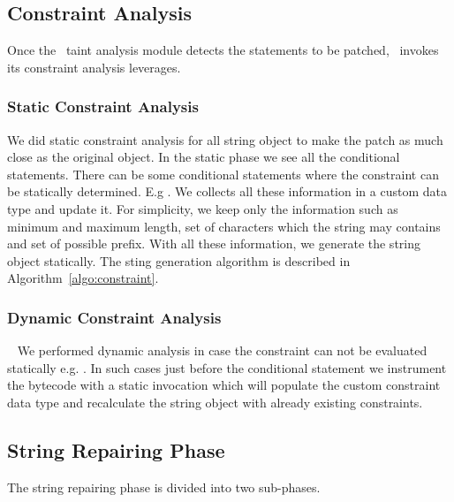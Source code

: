 \subsection{Constraint Analysis}
\label{subsec:constraint analysis}

Once the \infoflow\ taint analysis module detects the statements to be patched,
\tool\ invokes its constraint analysis leverages.

\subsubsection{Static Constraint Analysis}
\label{subsubsec:staticConstraint}

We did static constraint analysis for all string object to make the patch as much
close as the original object. In the static phase we see all the conditional 
statements. There can be some conditional statements where the constraint can 
be statically determined. E.g . We collects all these
information in a custom data type and update it. For simplicity, we keep only the 
information such as minimum and maximum length, set of characters which the string
may contains and set of possible prefix. With all these information, we generate 
the string object statically. The sting generation algorithm is described in
Algorithm~\ref{algo:constraint}. 

\subsubsection{Dynamic Constraint Analysis}
\label{subsubsec:dynamicConstraint}
~\newline
We performed dynamic analysis in case the constraint can not be evaluated 
statically e.g. . In such cases just
before the conditional statement we instrument the bytecode with a static 
invocation which will populate the custom constraint data type and recalculate 
the string object with already existing constraints.

\subsection{String Repairing Phase}
\label{subsec:stringReepairing}

The string repairing phase is divided into two sub-phases.

